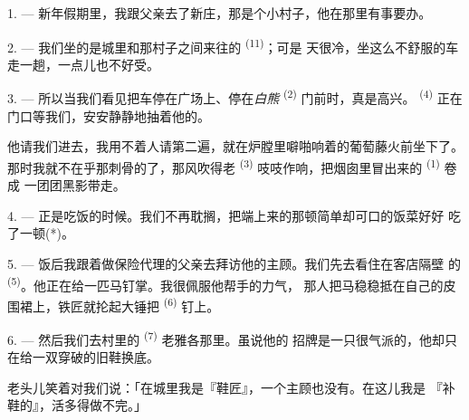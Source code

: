 

\VUsaut{4.0mm}
\VUsaut{3.0mm}
\VUfilet{16mm}
\VUsaut{5.6mm}
\VUsaut{3.0mm}

\VUsaut{3.0mm}

\VUsaut{4.0mm}

1. --- 新年假期里，我跟父亲去了新庄，那是个小村子，他在那里有事要办。

2. --- 我们坐的是城里和那村子之间来往的 \textsuperscript{(11)}；可是
天很冷，坐这么不舒服的车走一趟，一点儿也不好受。

3. --- 所以当我们看见把车停在广场上、停在\textit{白熊}
 \textsuperscript{(2)} 门前时，真是高兴。
\textsuperscript{(4)} 正在门口等我们，安安静静地抽着他的。

他请我们进去，我用不着人请第二遍，就在炉膛里噼啪响着的葡萄藤火前坐下了。
那时我就不在乎那刺骨的了，那风吹得老
\textsuperscript{(3)} 吱吱作响，把烟囱里冒出来的 \textsuperscript{(1)} 卷成
一团团黑影带走。

4. --- 正是吃饭的时候。我们不再耽搁，把端上来的那顿简单却可口的饭菜好好
吃了一顿(*)。

\VUsaut{3.0mm}

5. --- 饭后我跟着做保险代理的父亲去拜访他的主顾。我们先去看住在客店隔壁
的 \textsuperscript{(5)}。他正在给一匹马钉掌。我很佩服他帮手的力气，
那人把马稳稳抵在自己的皮围裙上，铁匠就抡起大锤把
\textsuperscript{(6)} 钉上。

6. --- 然后我们去村里的 \textsuperscript{(7)} 老雅各那里。虽说他的
招牌是一只很气派的，他却只在给一双穿破的旧鞋换底。

老头儿笑着对我们说：「在城里我是『鞋匠』，一个主顾也没有。在这儿我是
『补鞋的』，活多得做不完。」

